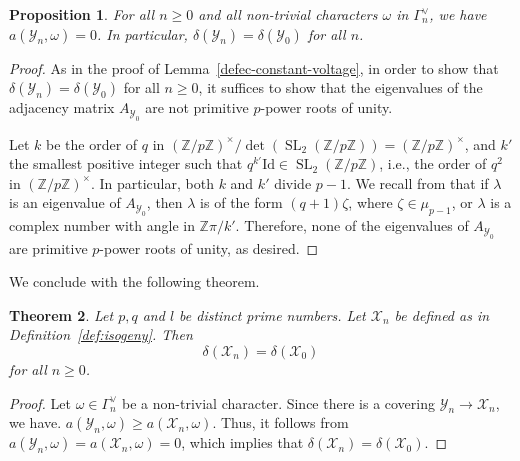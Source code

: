 \documentclass[11pt]{amsart}
\DeclareMathOperator{\SL}{SL}
\newtheorem{theorem}{Theorem}[section]
\newtheorem{proposition}[theorem]{Proposition}
\numberwithin{equation}{section}
\theoremstyle{remark}
\newcommand{\?}{\stackrel{?}{=}}
\newcommand{\cX}{\mathcal{X}}
\newcommand{\ZZ}{\mathbb{Z}}
\newcommand{\cY}{\mathcal{Y}}
\begin{document}

\begin{proposition}\label{prop:Yn}
For all $n\ge0$ and all non-trivial characters $\omega$ in $\Gamma_n^\vee$, we have    $a(\mathcal{Y}_n,\omega)=0$. In particular, $\delta(\mathcal{Y}_n)=\delta(\mathcal{Y}_0)$ for all $n$.
\end{proposition}
\begin{proof}
As in  the proof of Lemma~\ref{defec-constant-voltage}, in order to show that $\delta(\mathcal{Y}_n)=\delta(\mathcal{Y}_0)$ for all $n\ge0$, it suffices to show that the eigenvalues of the adjacency matrix $A_{\cY_0}$ are not primitive $p$-power roots of unity. 


Let $k$ be the order of $q$ in $(\ZZ/p\ZZ)^\times/\det(\SL_2(\ZZ/p\ZZ))=(\ZZ/p\ZZ)^\times$, and $k'$ the smallest positive integer such that $q^{k'}\mathrm{Id}\in\SL_2(\ZZ/p\ZZ)$, i.e., the order of $q^2$ in $(\ZZ/p\ZZ)^\times$. In particular, both $k$ and $k'$ divide $p-1$.
We recall from \cite[Theorem 1.6]{codogni-lido} that if $\lambda$ is an eigenvalue of $A_{\cY_0}$, then $\lambda$ is of the form $(q+1)\zeta$, where $\zeta\in\mu_{p-1}$, or $\lambda$ is a complex number with angle in $\ZZ\pi/k'$. Therefore, none of the eigenvalues of $A_{\cY_0}$ are primitive $p$-power roots of unity, as desired.
\end{proof}


We conclude with the following theorem.



\begin{theorem}
\label{cor.delta-isogeny}
Let $p,q$ and $l$ be distinct prime numbers. 
    Let $\cX_n$ be defined as in Definition~\ref{def:isogeny}. Then \[\delta(\mathcal{X}_n)=\delta(\mathcal{X}_0)\]
    for all $n\ge 0$. 
\end{theorem}
\begin{proof}Let $\omega\in\Gamma_n^\vee$ be a non-trivial character.
Since there is a covering $\mathcal{Y}_n\to\mathcal{X}_n$, we have. $a(\mathcal{Y}_n,\omega)\ge a(\mathcal{X}_n,\omega)$. Thus, it follows from $a(\mathcal{Y}_n,\omega)= a(\mathcal{X}_n,\omega)=0$, which implies that $\delta(\cX_n)=\delta(\cX_0)$. 
    \end{proof}
 

\end{document}
